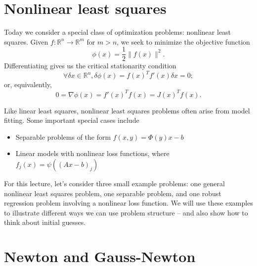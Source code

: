 \documentclass[12pt, leqno]{article} %
\providecommand{\tightlist}{%
  \setlength{\itemsep}{0pt}\setlength{\parskip}{0pt}}
\begin{document}

\section{Nonlinear least squares}

Today we consider a special class of optimization problems: nonlinear
least squares. Given \(f : \mathbb{R}^n \rightarrow \mathbb{R}^m\) for
\(m > n\), we seek to minimize the objective function
\[\phi(x) = \frac{1}{2} \|f(x)\|^2.\] Differentiating gives us the
critical stationarity condition
\[\forall \delta x \in \mathbb{R}^n, \delta \phi(x) = f(x)^T f'(x) \delta x = 0;\]
or, equivalently, \[0 = \nabla \phi(x) = f'(x)^T f(x) = J(x)^T f(x).\]

Like linear least squares, nonlinear least squares problems often arise
from model fitting. Some important special cases include

\begin{itemize}
\tightlist
\item
  Separable problems of the form \(f(x, y) = \Phi(y) x - b\)
\item
  Linear models with nonlinear loss functions, where
  \(f_j(x) = \psi((Ax-b)_j)\)
\end{itemize}

For this lecture, let's consider three small example problems: one
general nonlinear least squares problem, one separable problem, and one
robust regression problem involving a nonlinear loss function. We will
use these examples to illustrate different ways we can use problem
structure -- and also show how to think about initial guesses.

\section{Newton and Gauss-Newton}
\end{document}
